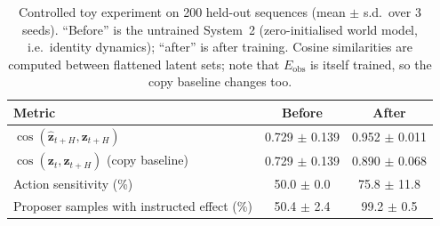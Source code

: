 
\begin{table}[t]
\centering
\caption{Controlled toy experiment on 200 held-out sequences (mean $\pm$ s.d.\ over 3 seeds). ``Before'' is the untrained System~2 (zero-initialised world model, i.e.\ identity dynamics); ``after'' is after training. Cosine similarities are computed between flattened latent sets; note that $E_{\mathrm{obs}}$ is itself trained, so the copy baseline changes too.}
\label{tab:toy}
\small
\begin{tabular}{lcc}
\toprule
Metric & Before & After \\
\midrule
$\cos(\hat{\bm z}_{t+H}, \bm z_{t+H})$ & 0.729 $\pm$ 0.139 & 0.952 $\pm$ 0.011 \\
$\cos(\bm z_t, \bm z_{t+H})$ (copy baseline) & 0.729 $\pm$ 0.139 & 0.890 $\pm$ 0.068 \\
Action sensitivity (\%) & 50.0 $\pm$ 0.0 & 75.8 $\pm$ 11.8 \\
Proposer samples with instructed effect (\%) & 50.4 $\pm$ 2.4 & 99.2 $\pm$ 0.5 \\
\bottomrule
\end{tabular}
\end{table}

